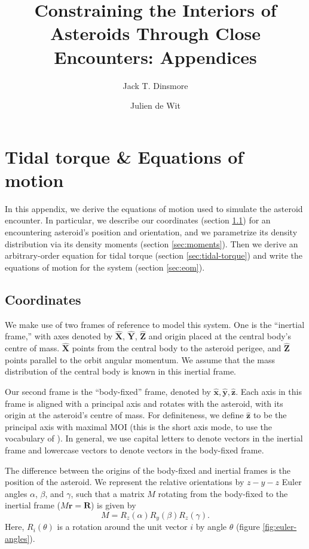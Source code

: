 \documentclass[9pt,twocolumn]{article}
\title{\Huge Constraining the Interiors of Asteroids Through Close Encounters: Appendices}
\author[1]{Jack T. Dinsmore}
\author[2]{Julien de Wit}
\affil[1]{Department of Physics, Massachusetts Institute of Technology}
\affil[2]{Department of Earth, Atmospheric, and Planetary Science, Massachusetts Institute of Technology}
\newcommand{\unit}[1]{\bm{\hat{#1}}}
\numberwithin{equation}{section}
\begin{document}
\maketitle

\section{Tidal torque \& Equations of motion}
\label{app:eom}

In this appendix, we derive the equations of motion used to simulate the asteroid encounter. In particular, we describe our coordinates (section \ref{sec:coordinates}) for an encountering asteroid's position and orientation, and we parametrize its density distribution via its density moments (section \ref{sec:moments}). Then we derive an arbitrary-order equation for tidal torque (section \ref{sec:tidal-torque}) and write the equations of motion for the system (section \ref{sec:eom}).

\subsection{Coordinates}
\label{sec:coordinates}

We make use of two frames of reference to model this system. One is the ``inertial frame,'' with axes denoted by $\unit{X}$, $\unit{Y}$, $\unit{Z}$ and origin placed at the central body's centre of mass. $\unit{X}$ points from the central body to the asteroid perigee, and $\unit{Z}$ points parallel to the orbit angular momentum. We assume that the mass distribution of the central body is known in this inertial frame.

Our second frame is the ``body-fixed'' frame, denoted by $\unit{x}, \unit{y}, \unit{z}$. Each axis in this frame is aligned with a principal axis and rotates with the asteroid, with its origin at the asteroid's centre of mass. For definiteness, we define $\unit{z}$ to be the principal axis with maximal MOI (this is the short axis mode, to use the vocabulary of \cite{kaasalainen2001interpretation}). In general, we use capital letters to denote vectors in the inertial frame and lowercase vectors to denote vectors in the body-fixed frame.

The difference between the origins of the body-fixed and inertial frames is the position of the asteroid. We represent the relative orientations by $z-y-z$ Euler angles $\alpha$, $\beta$, and $\gamma$, such that a matrix $M$ rotating from the body-fixed to the inertial frame ($M\bm{r} = \bm{R}$) is given by
\begin{equation}
M = R_z(\alpha) R_y(\beta) R_z(\gamma).
\label{eqn:euler-angles}
\end{equation}
Here, $R_i(\theta)$ is a rotation around the unit vector $i$ by angle $\theta$ (figure \ref{fig:euler-angles}).
\end{document}
